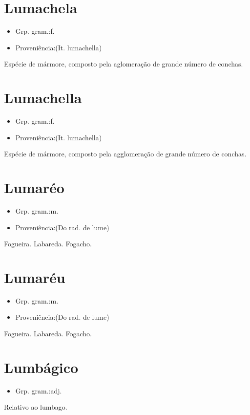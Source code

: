 \section{Lumachela}
\begin{itemize}
\item {Grp. gram.:f.}
\end{itemize}
\begin{itemize}
\item {Proveniência:(It. \textunderscore lumachella\textunderscore )}
\end{itemize}
Espécie de mármore, composto pela aglomeração de grande número de conchas.
\section{Lumachella}
\begin{itemize}
\item {Grp. gram.:f.}
\end{itemize}
\begin{itemize}
\item {Proveniência:(It. \textunderscore lumachella\textunderscore )}
\end{itemize}
Espécie de mármore, composto pela agglomeração de grande número de conchas.
\section{Lumaréo}
\begin{itemize}
\item {Grp. gram.:m.}
\end{itemize}
\begin{itemize}
\item {Proveniência:(Do rad. de \textunderscore lume\textunderscore )}
\end{itemize}
Fogueira.
Labareda.
Fogacho.
\section{Lumaréu}
\begin{itemize}
\item {Grp. gram.:m.}
\end{itemize}
\begin{itemize}
\item {Proveniência:(Do rad. de \textunderscore lume\textunderscore )}
\end{itemize}
Fogueira.
Labareda.
Fogacho.
\section{Lumbágico}
\begin{itemize}
\item {Grp. gram.:adj.}
\end{itemize}
Relativo ao lumbago.
